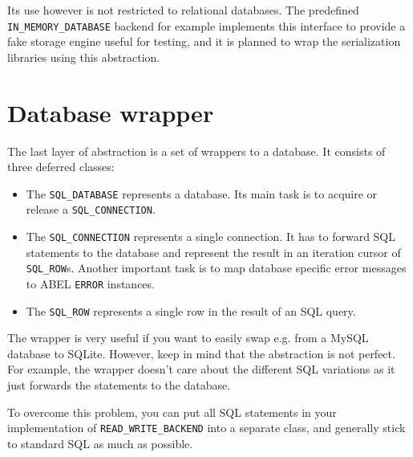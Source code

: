 \documentclass[a4paper,12pt]{report}
\begin{document}
Its use however is not restricted to relational databases.
The predefined \lstinline!IN_MEMORY_DATABASE! backend for example implements this interface to provide a fake storage engine useful for testing, and it is planned to wrap the serialization libraries using this abstraction.

\section{Database wrapper}


The last layer of abstraction is a set of wrappers to a database. 
It consists of three deferred classes: 
\begin{itemize}
 \item The \lstinline!SQL_DATABASE! represents a database. Its main task is to acquire or release a \lstinline!SQL_CONNECTION!.
 \item The \lstinline!SQL_CONNECTION! represents a single connection. 
It has to forward SQL statements to the database and represent the result in an iteration cursor of \lstinline!SQL_ROW!s.
Another important task is to map database specific error messages to ABEL \lstinline!ERROR! instances.
  \item The \lstinline!SQL_ROW! represents a single row in the result of an SQL query.
\end{itemize}

The wrapper is very useful if you want to easily swap e.g. from a MySQL database to SQLite.
However, keep in mind that the abstraction is not perfect. 
For example, the wrapper doesn't care about the different SQL variations as it just forwards the statements to the database.

To overcome this problem, you can put all SQL statements in your implementation of \lstinline!READ_WRITE_BACKEND! into a separate class, and generally stick to standard SQL as much as possible.
\end{document}

